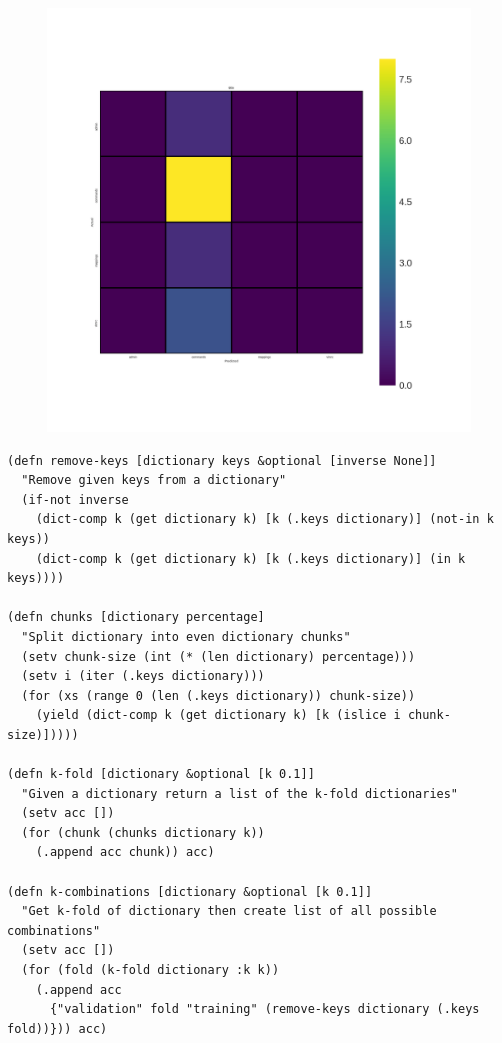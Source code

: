 \documentclass[12pt, a4paper]{article}
\begin{document}
\begin{figure}[H]
    \label{fig:svm}
    \includegraphics[width=\textwidth]{../train_validate_libsvm/heatmaps/svm.png}
\end{figure}

\begin{minipage}{\linewidth} %
\vspace{2em}
\begin{verbatim}
(defn remove-keys [dictionary keys &optional [inverse None]]
  "Remove given keys from a dictionary"
  (if-not inverse
    (dict-comp k (get dictionary k) [k (.keys dictionary)] (not-in k keys))
    (dict-comp k (get dictionary k) [k (.keys dictionary)] (in k keys))))

(defn chunks [dictionary percentage]
  "Split dictionary into even dictionary chunks"
  (setv chunk-size (int (* (len dictionary) percentage)))
  (setv i (iter (.keys dictionary)))
  (for (xs (range 0 (len (.keys dictionary)) chunk-size))
    (yield (dict-comp k (get dictionary k) [k (islice i chunk-size)]))))

(defn k-fold [dictionary &optional [k 0.1]]
  "Given a dictionary return a list of the k-fold dictionaries"
  (setv acc [])
  (for (chunk (chunks dictionary k))
    (.append acc chunk)) acc)

(defn k-combinations [dictionary &optional [k 0.1]]
  "Get k-fold of dictionary then create list of all possible combinations"
  (setv acc [])
  (for (fold (k-fold dictionary :k k))
    (.append acc
      {"validation" fold "training" (remove-keys dictionary (.keys fold))})) acc)
\end{verbatim}
\vspace{2em}
\end{minipage}
\end{document}
